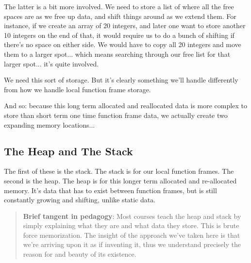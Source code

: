 \documentclass[12pt]{article}
\begin{document}
\begin{center}
\end{center}

The latter is a bit more involved. We need to store a list of where all the free spaces are as we free up data, and shift things around as we extend them. For instance, if we create an array of 20 integers, and later one want to store another 10 integers on the end of that, it would require us to do a bunch of shifting if there's no space on either side. We would have to copy all 20 integers and move them to a larger spot... which means searching through our free list for that larger spot... it's quite involved.

We need this sort of storage. But it's clearly something we'll handle differently from how we handle local function frame storage.

And so: because this long term allocated and reallocated data is more complex to store than short term one time function frame data, we actually create two expanding memory locations...

\subsection*{The Heap and The Stack}

The first of these is the stack. The stack is for our local function frames. The second is the heap. The heap is for this longer term allocated and re-allocated memory. It's data that has to exist between function frames, but is still constantly growing and shifting, unlike static data.

\begin{quote}
{\scriptsize
\textbf{Brief tangent in pedagogy}: Most courses teach the heap and stack by simply explaining what they are and what data they store. This is brute force memorization. The insight of the approach we've taken here is that we're arriving upon it as if inventing it, thus we understand precisely the reason for and beauty of its existence.
}
\end{quote}
\end{document}
